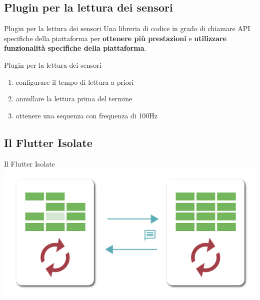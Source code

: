 \documentclass{beamer}
\begin{document}
    \subsection{Plugin per la lettura dei sensori}
    \begin{frame}{Plugin per la lettura dei sensori}
        Una libreria di codice in grado di chiamare API specifiche della piattaforma per {\bfseries ottenere più prestazioni} e {\bfseries utilizzare funzionalità specifiche della piattaforma}.
    \end{frame}
    \begin{frame}{Plugin per la lettura dei sensori}
        \begin{enumerate}
            \item configurare il tempo di lettura a priori
            \pause
            \item annullare la lettura prima del termine
            \pause
            \item ottenere una sequenza con frequenza di 100Hz
        \end{enumerate}
    \end{frame}

    \subsection{Il Flutter Isolate}
    \begin{frame}{Il Flutter Isolate}
        \centering
        \includegraphics[scale=0.5]{../figures/isolate.png}
    \end{frame}
\end{document}

